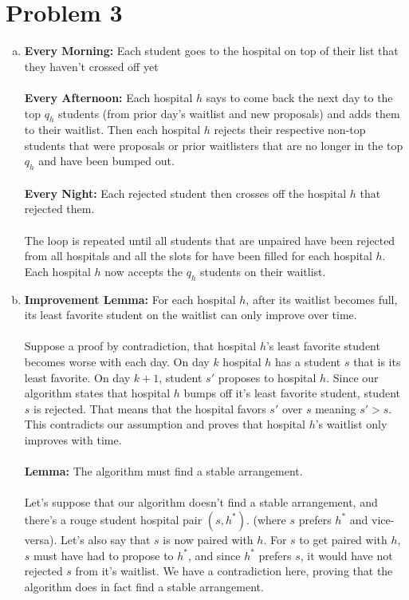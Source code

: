 \documentclass[11pt,letterpaper]{article}
\begin{document}
\section*{Problem 3}
\begin{enumerate}[(a)]
\item
\textbf{Every Morning:} Each student goes to the hospital on top of their list that they haven't  crossed off yet\\
\\
\textbf{Every Afternoon:} Each hospital $h$ says to come back the next day to the top $q_h$ students (from prior day's waitlist and new proposals) and adds them to their waitlist. Then each hospital $h$ rejects their respective non-top students that were proposals or prior waitlisters that are no longer in the top $q_h$ and have been bumped out.\\
\\
\textbf{Every Night:} Each rejected student then crosses off the hospital $h$ that rejected them.\\
\\
The loop is repeated until all students that are unpaired have been rejected from all hospitals and all the slots for have been filled for each hospital $h$. Each hospital $h$ now accepts the $q_h$ students on their waitlist.\\

\item
\textbf{Improvement Lemma:} For each hospital $h$, after its waitlist becomes full, its least favorite student on the waitlist can only improve over time.
\\
\\
Suppose a proof by contradiction, that hospital $h$'s least favorite student becomes worse with each day. On day $k$ hospital $h$ has a student $s$ that is its least favorite. On day $k+1$, student $s\prime$ proposes to hospital $h$. Since our algorithm states that hospital $h$ bumps off it's least favorite student, student $s$ is rejected. That means that the hospital favors $s\prime$ over $s$ meaning $s\prime > s$. This contradicts our assumption and proves that hospital $h$'s waitlist only improves with time.
\\\\
\textbf{Lemma:} The algorithm must find a stable arrangement.\\
\\
Let's suppose that our algorithm doesn't find a stable arrangement, and there's a rouge student hospital pair $(s,h^*)$. (where $s$ prefers $h^*$ and vice-versa). Let's also say that $s$ is now paired with $h$. For $s$ to get paired with $h$, $s$ must have had to propose to $h^*$, and since $h^*$ prefers $s$, it would have not rejected $s$ from it's waitlist. We have a contradiction here, proving that the algorithm does in fact find a stable arrangement.\\

\end{enumerate}
\clearpage
\end{document}
